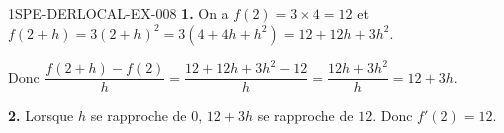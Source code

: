 \begin{corrige}{1SPE-DERLOCAL-EX-008}
\textbf{1.} On a $f(2)=3\times 4=12$ et $f(2+h)=3(2+h)^2=3(4+4h+h^2)=12+12h+3h^2$.

Donc $\dfrac{f(2+h)-f(2)}{h}=\dfrac{12+12h+3h^2-12}{h}=\dfrac{12h+3h^2}{h}=12+3h$.

\textbf{2.} Lorsque $h$ se rapproche de $0$, $12+3h$ se rapproche de $12$. Donc $f'(2)=12$.
\end{corrige}

